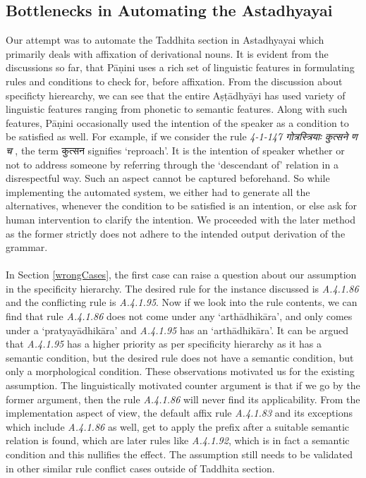 \documentclass[11pt]{article}
\begin{document}
\subsection{Bottlenecks in Automating the Astadhyayai}
\label{bottlenecks}

Our attempt was to automate the Taddhita section in Astadhyayai which primarily deals with affixation of derivational nouns. It is evident from the discussions so far, that Pāṇini uses a rich set of linguistic features in formulating rules and conditions to check for, before affixation. From the discussion about specificty hierearchy, we can see that the entire Aṣṭādhyāyi has used variety of linguistic features ranging from phonetic to semantic features. Along with such features, Pāṇini occasionally used the intention of the speaker as a condition to be satisfied as well. For example, if we consider the rule {\sl 4-1-147 \skt गोत्रस्त्रियाः कुत्सने ण च }, the term {\skt कुत्सन} signifies `reproach'. It is the intention of speaker whether or not to address someone by referring through the `descendant of' relation in a disrespectful way. Such an aspect cannot be captured beforehand. So while implementing the automated system, we either had to generate all the alternatives, whenever the condition to be satisfied is an intention, or else ask for human intervention to clarify the intention. We proceeded with the later method as the former strictly does not adhere to the intended output derivation of the grammar. 
\\ \\ 
In Section \ref{wrongCases}, the first case can raise a question about our assumption in the specificity hierarchy. The desired rule for the instance discussed is {\sl A.4.1.86} and the conflicting rule is {\sl A.4.1.95}. Now if we look into the rule contents, we can find that rule {\sl A.4.1.86} does not come under any `arthādhikāra', and only comes under a `pratyayādhikāra' and {\sl A.4.1.95} has an `arthādhikāra'. It can be argued that {\sl A.4.1.95} has a higher priority as per specificity hierarchy as it has a semantic condition, but the desired rule does not have a semantic condition, but only a morphological condition. These observations motivated us for the existing assumption. The linguistically motivated counter argument is that if we go by the former argument, then the rule {\sl A.4.1.86} will never find its applicability. From the implementation aspect of view, the default affix rule {\sl A.4.1.83} and its exceptions which include {\sl A.4.1.86} as well, get to apply the prefix after a suitable semantic relation is found, which are later rules like {\sl A.4.1.92}, which is in fact a semantic condition and this nullifies the effect. The assumption still needs to be validated in other similar rule conflict cases outside of Taddhita section.
\end{document}
